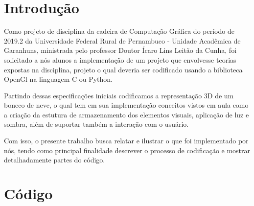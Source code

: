 \documentclass[
	article,			%
	11pt,				%
	oneside,			%
	a4paper,			%
	english,			%
	brazil,				%
	sumario=tradicional
	]{abntex2}
\begin{document}
\frenchspacing 


%
%
\maketitle



\textual

\section*{Introdução}

Como projeto de disciplina da cadeira de Computação Gráfica do período de 2019.2 da Universidade 
Federal Rural de Pernambuco - Unidade Acadêmica de Garanhuns, ministrada pelo 
professor Doutor Ícaro Lins Leitão da Cunha, foi solicitado a nós alunos a implementação de um
projeto que envolvesse teorias expostas na disciplina, projeto o qual deveria ser codificado 
usando a biblioteca OpenGl na linguagem C ou Python.

Partindo dessas especificações iniciais codificamos a representação 3D de um boneco de neve, o qual
tem em sua implementação conceitos vistos em aula como a criação da estutura de armazenamento dos
elementos visuais, aplicação de luz e sombra, além de suportar também a interação com o usuário.

Com isso, o presente trabalho busca relatar e ilustrar o que foi implementado por nós, tendo
como principal finalidade descrever o processo de codificação e mostrar detalhadamente partes do código.

\section{Código}
\end{document}
